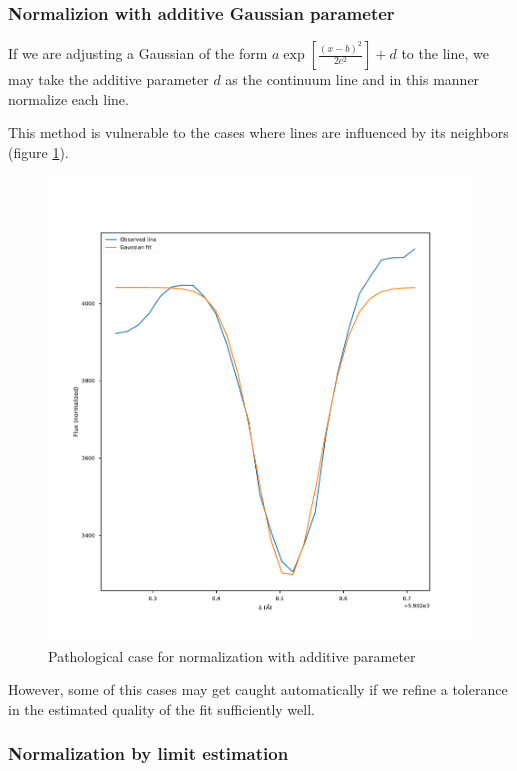 \documentclass{aa}
\begin{document}
\subsubsection{Normalizion with additive Gaussian parameter}
\label{sec:norm1}

If we are adjusting a Gaussian of the form $a \exp \left[ \frac{(x-b)^2}{2c^2} \right] +
d$ to the line, we may take the additive parameter $d$ as the continuum line and
in this manner normalize each line.

This method is vulnerable to the cases where lines are influenced by its
neighbors (figure \ref{fig:additive_parameter}).

\begin{figure}[h]
  \centering
  \includegraphics[width=\linewidth]{normalization_with_d.pdf}
  \caption{Pathological case for normalization with additive parameter}
  \label{fig:additive_parameter}
\end{figure}

However, some of this cases may get caught automatically if we refine a
tolerance in the estimated quality of the fit sufficiently well.

\subsubsection{Normalization by limit estimation}
\label{sec:norm2}
\end{document}
